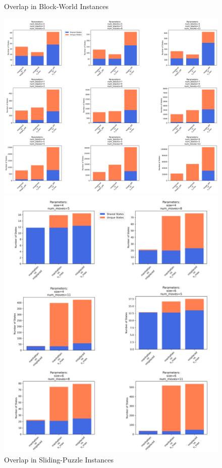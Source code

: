 \documentclass[letterpaper]{article}
\begin{document}
\begin{figure}[ht]
    \centering
    \begin{minipage}{0.57\textwidth} %
        \centering
        \caption*{Overlap in Block-World Instances}
        \includegraphics[width=\textwidth]{plots/blocks_world_state_overlap_2.png}
    \end{minipage}%
    \hfill
    \begin{minipage}{0.39\textwidth} %
        \centering
        \caption*{Overlap in Sliding-Puzzle Instances}
        \includegraphics[width=\textwidth]{plots/sliding_puzzle_state_overlap_2.png}

\end{minipage}
\end{figure}
\end{document}
